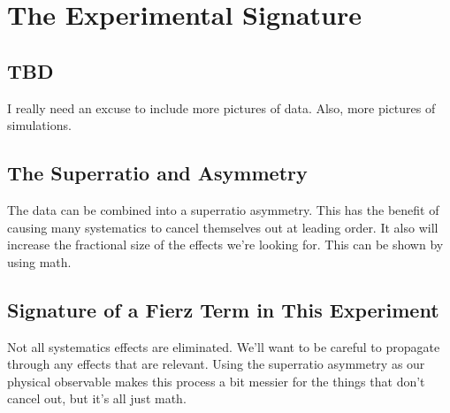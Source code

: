 

\clearpage	

\chapter{The Experimental Signature}
\label{analysis_chapter}

\section{TBD}
I really need an excuse to include more pictures of data.  Also, more pictures of simulations.






\section{The Superratio and Asymmetry}
The data can be combined into a superratio asymmetry.  This has the benefit of causing many systematics to cancel themselves out at leading order.  It also will increase the fractional size of the effects we're looking for.  This can be shown by using math.  

\section{Signature of a Fierz Term in This Experiment}
Not all systematics effects are eliminated.  We'll want to be careful to propagate through any effects that are relevant.  Using the superratio asymmetry as our physical observable makes this process a bit messier for the things that don't cancel out, but it's all just math.  

